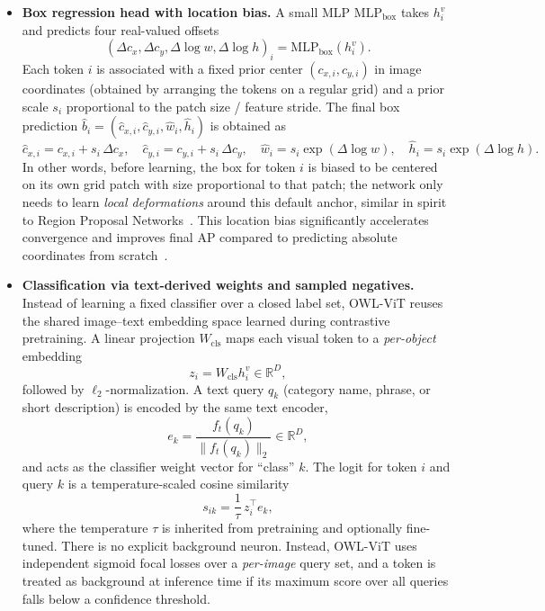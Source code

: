 \begin{enrichment}
\begin{enrichment}[Method][subsection]
		\begin{itemize}
			\item \textbf{Box regression head with location bias.}
			A small MLP $\mathrm{MLP}_{\text{box}}$ takes $h^v_i$ and predicts four real-valued offsets
			\[
			(\Delta c_x,\Delta c_y,\Delta \log w,\Delta \log h)_i
			= \mathrm{MLP}_{\text{box}}(h^v_i).
			\]
			Each token $i$ is associated with a fixed prior center $(c_{x,i}, c_{y,i})$ in image coordinates (obtained by arranging the tokens on a regular grid) and a prior scale $s_i$ proportional to the patch size / feature stride.
			The final box prediction $\hat{b}_i = (\hat{c}_{x,i},\hat{c}_{y,i},\hat{w}_i,\hat{h}_i)$ is obtained as
			\[
			\hat{c}_{x,i} = c_{x,i} + s_i \,\Delta c_x,\quad
			\hat{c}_{y,i} = c_{y,i} + s_i \,\Delta c_y,\quad
			\hat{w}_i = s_i \exp(\Delta \log w),\quad
			\hat{h}_i = s_i \exp(\Delta \log h).
			\]
			In other words, before learning, the box for token $i$ is biased to be centered on its own grid patch with size proportional to that patch; the network only needs to learn \emph{local deformations} around this default anchor, similar in spirit to Region Proposal Networks~\cite{ren2015_fasterrcnn}.
			This location bias significantly accelerates convergence and improves final AP compared to predicting absolute coordinates from scratch~\cite{minderer2022_owlvit}.
			
			\item \textbf{Classification via text-derived weights and sampled negatives.}
			Instead of learning a fixed classifier over a closed label set, OWL-ViT reuses the shared image–text embedding space learned during contrastive pretraining.
			A linear projection $W_{\text{cls}}$ maps each visual token to a \emph{per-object} embedding
			\[
			z_i = W_{\text{cls}} h^v_i \in \mathbb{R}^{D},
			\]
			followed by $\ell_2$-normalization.
			A text query $q_k$ (category name, phrase, or short description) is encoded by the same text encoder,
			\[
			e_k = \frac{f_t(q_k)}{\|f_t(q_k)\|_2} \in \mathbb{R}^D,
			\]
			and acts as the classifier weight vector for ``class'' $k$.
			The logit for token $i$ and query $k$ is a temperature-scaled cosine similarity
			\[
			s_{ik} = \frac{1}{\tau}\, z_i^\top e_k,
			\]
			where the temperature $\tau$ is inherited from pretraining and optionally fine-tuned.
			There is no explicit background neuron.
			Instead, OWL-ViT uses independent sigmoid focal losses over a \emph{per-image} query set, and a token is treated as background at inference time if its maximum score over all queries falls below a confidence threshold.
			

\end{itemize}
\end{enrichment}
\end{enrichment}
